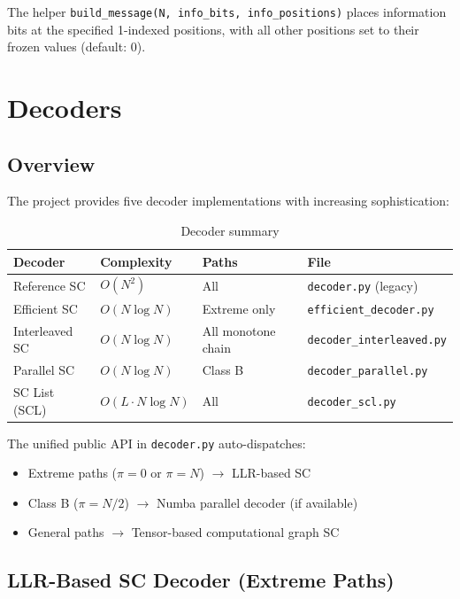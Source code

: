 \documentclass[11pt,a4paper]{article}
\begin{document}
The helper \texttt{build\_message(N, info\_bits, info\_positions)} places
information bits at the specified 1-indexed positions, with all other
positions set to their frozen values (default: 0).


\section{Decoders}
\label{sec:decoders}

\subsection{Overview}

The project provides five decoder implementations with increasing
sophistication:

\begin{table}[h]
\centering
\caption{Decoder summary}
\begin{tabular}{llll}
\toprule
\textbf{Decoder} & \textbf{Complexity} & \textbf{Paths} & \textbf{File} \\
\midrule
Reference SC  & $O(N^2)$ & All & \texttt{decoder.py} (legacy) \\
Efficient SC  & $O(N \log N)$ & Extreme only & \texttt{efficient\_decoder.py} \\
Interleaved SC & $O(N \log N)$ & All monotone chain & \texttt{decoder\_interleaved.py} \\
Parallel SC   & $O(N \log N)$ & Class B & \texttt{decoder\_parallel.py} \\
SC List (SCL) & $O(L \cdot N \log N)$ & All & \texttt{decoder\_scl.py} \\
\bottomrule
\end{tabular}
\end{table}

The unified public API in \texttt{decoder.py} auto-dispatches:
\begin{itemize}
  \item Extreme paths ($\pi = 0$ or $\pi = N$) $\to$ LLR-based SC
  \item Class B ($\pi = N/2$) $\to$ Numba parallel decoder (if available)
  \item General paths $\to$ Tensor-based computational graph SC
\end{itemize}

\subsection{LLR-Based SC Decoder (Extreme Paths)}
\end{document}
